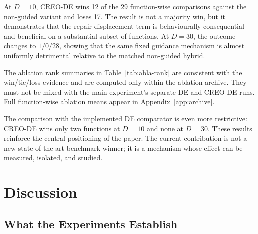 \documentclass[journal]{IEEEtran}
\begin{document}
At $D=10$, CREO-DE wins 12 of the 29 function-wise comparisons against the non-guided variant and loses 17. The result is not a majority win, but it demonstrates that the repair-displacement term is behaviourally consequential and beneficial on a substantial subset of functions. At $D=30$, the outcome changes to $1/0/28$, showing that the same fixed guidance mechanism is almost uniformly detrimental relative to the matched non-guided hybrid.

\begin{table}[t]
\centering
\caption{Experiment 2: three-method ablation archive ranks across 29 functions, computed separately for each dimension from unrounded archived function-wise means.}
\label{tab:abla-rank}
\footnotesize
{}
\end{table}

The ablation rank summaries in Table~\ref{tab:abla-rank} are consistent with the win/tie/loss evidence and are computed only within the ablation archive. They must not be mixed with the main experiment's separate DE and CREO-DE runs. Full function-wise ablation means appear in Appendix~\ref{app:archive}.

The comparison with the implemented DE comparator is even more restrictive: CREO-DE wins only two functions at $D=10$ and none at $D=30$. These results reinforce the central positioning of the paper. The current contribution is not a new state-of-the-art benchmark winner; it is a mechanism whose effect can be measured, isolated, and studied.

\section{Discussion}

\subsection{What the Experiments Establish}
\end{document}
